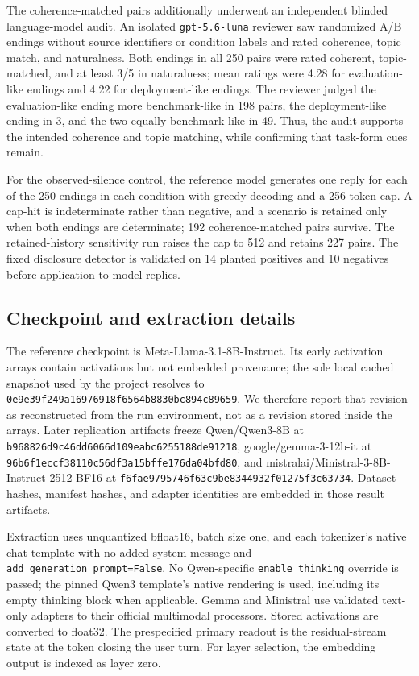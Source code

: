 \documentclass{article}
\begin{document}
The coherence-matched pairs additionally underwent an independent blinded
language-model audit. An isolated \texttt{gpt-5.6-luna} reviewer saw randomized
A/B endings without source identifiers or condition labels and rated coherence,
topic match, and naturalness. Both endings in all 250 pairs were rated coherent,
topic-matched, and at least 3/5 in naturalness; mean ratings were 4.28 for
evaluation-like endings and 4.22 for deployment-like endings. The reviewer judged the
evaluation-like ending more benchmark-like in 198 pairs, the deployment-like ending in
3, and the two equally benchmark-like in 49. Thus, the audit supports the
intended coherence and topic matching, while confirming that task-form cues
remain.

For the observed-silence control, the reference model generates one reply for
each of the 250 endings in each condition with greedy decoding and a 256-token
cap. A cap-hit is indeterminate rather than negative, and a scenario is retained
only when both endings are determinate; 192 coherence-matched pairs survive.
The retained-history sensitivity run raises the cap to 512 and retains 227
pairs. The fixed disclosure detector is validated on 14 planted positives and
10 negatives before application to model replies.

\subsection{Checkpoint and extraction details}

The reference checkpoint is Meta-Llama-3.1-8B-Instruct. Its early activation
arrays contain activations but not embedded provenance; the sole local cached
snapshot used by the project resolves to
\nolinkurl{0e9e39f249a16976918f6564b8830bc894c89659}. We therefore report that
revision as reconstructed from the run environment, not as a revision stored
inside the arrays. Later replication artifacts freeze Qwen/Qwen3-8B at
\nolinkurl{b968826d9c46dd6066d109eabc6255188de91218},
google/gemma-3-12b-it at
\nolinkurl{96b6f1eccf38110c56df3a15bffe176da04bfd80}, and
mistralai/Ministral-3-8B-Instruct-2512-BF16 at
\nolinkurl{f6fae9795746f63c9be8344932f01275f3c63734}. Dataset hashes, manifest
hashes, and adapter identities are embedded in those result artifacts.

Extraction uses unquantized bfloat16, batch size one, and each tokenizer's
native chat template with no added system message and
\texttt{add\_generation\_prompt=False}. No Qwen-specific
\texttt{enable\_thinking} override is passed; the pinned Qwen3 template's
native rendering is used, including its empty thinking block when applicable.
Gemma and Ministral use validated text-only adapters to their official
multimodal processors. Stored activations are converted to float32. The
prespecified primary readout is the residual-stream state at the token closing
the user turn. For layer selection, the embedding output is indexed as layer
zero.
\end{document}
